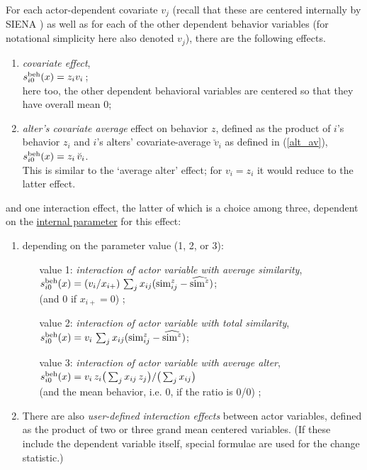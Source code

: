 \documentclass[a4paper,fleqn]{article}
\newcommand{\+}{\, + \,}
\newcommand{\vit}{\theenumi}
\newcommand{\SI}{{\sf SIENA }}
\newcounter{savenumi}
\begin{document}
{\noindent
For each actor-dependent covariate $v_j$ (recall that these are
centered internally by \SI) as well as for each of the other
dependent behavior variables (for notational simplicity here also
denoted $v_j$), there are the following effects.

\begin{enumerate}
\setcounter{enumi}{\value{savenumi}}
 \item {\em covariate effect},\\
 $s^{\rm beh}_{i\vit}(x) = z_{i} v_{i}\,$;\\
 here too, the other dependent behavioral variables are centered so that they
 have overall mean 0;
\item \emph{alter's covariate average } effect on behavior $z$,
      defined as the product of $i$'s behavior $z_i$ and
      $i$'s alters' covariate-average $\breve v_i$ as defined
      in (\ref{alt_av}),\\
       $s^{\rm beh}_{i\vit}(x) = z_i \, \breve v_i $.\\
      This is similar to the `average alter' effect; for
      $v_i = z_i$ it would reduce to the latter effect.
\setcounter{savenumi}{\value{enumi}}
\end{enumerate}


\iffalse
 and one interaction effect,
the latter of which is a choice among three, dependent on the
\hyperlink{T_effpar}{internal parameter} for this effect:
\begin{enumerate}
\setcounter{enumi}{\value{savenumi}}
 \item depending on the parameter value (1, 2, or 3):
 \begin{enumerate}
   \item[value 1:] {\em interaction of actor variable with average similarity},\\
 $s^{\rm beh}_{i\vit}(x) = (v_i / x_{i+}) \,
         \sum_j x_{ij} ({\rm sim}^z_{ij} - \widehat{{\rm sim}^z}) $;\\
    (and 0 if $x_{i+} = 0$) ;
   \item[value 2:] {\em interaction of actor variable with total similarity},\\
 $s^{\rm beh}_{i\vit}(x) = v_i \,
         \sum_j x_{ij} ({\rm sim}^z_{ij} - \widehat{{\rm sim}^z}) $;\\
   \item[value 3:] {\em interaction of actor variable with average alter},\\
 $s^{\rm beh}_{i\vit}(x) =  v_i \, z_i \big( \sum_j x_{ij}\, z_j \big)
                                / \big (\sum_j x_{ij}\big)  $\\
 (and the mean behavior, i.e. $0$, if the ratio is 0/0) ;
 \end{enumerate}
\item There are also {\em user-defined interaction effects}
      between actor variables, defined as the product of two
      or three grand mean centered variables.
      (If these include the dependent variable itself,
      special formulae are used for the change statistic.)



\end{enumerate}}
\end{document}
